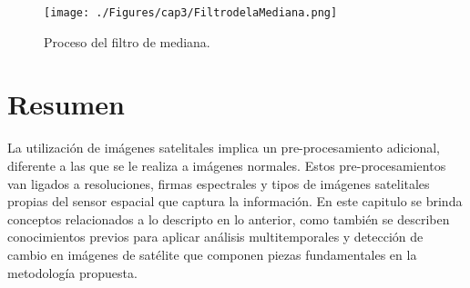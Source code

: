     \begin{figure}[H]
    	\centering
    	\texttt{[image: ./Figures/cap3/FiltrodelaMediana.png]}
    	\caption{Proceso del filtro de mediana.}
    	\label{fig:filMediata}
    \end{figure}

\section{Resumen}

La utilizaci\'on de im\'agenes satelitales implica un pre-procesamiento adicional, diferente a las que se le realiza a im\'agenes normales. Estos pre-procesamientos van ligados a resoluciones, firmas espectrales y tipos de im\'agenes satelitales propias del sensor espacial que captura la informaci\'on. En este capitulo se brinda conceptos relacionados a lo descripto en lo anterior, como tambi\'en se describen conocimientos previos para aplicar an\'alisis multitemporales y detecci\'on de cambio en im\'agenes de sat\'elite que componen piezas fundamentales en la metodolog\'ia propuesta.